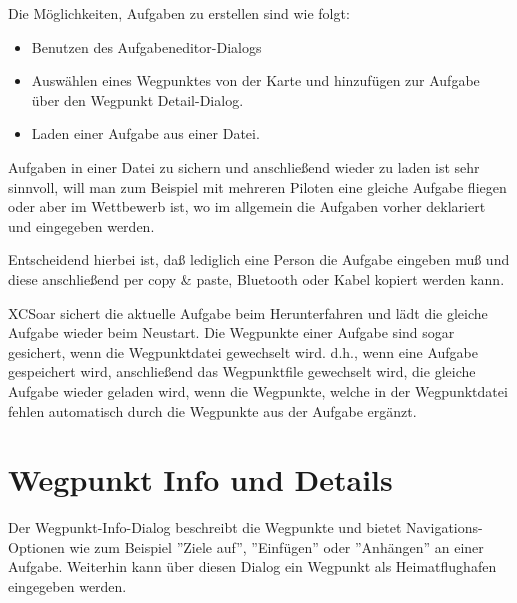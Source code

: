 Die Möglichkeiten, Aufgaben zu erstellen sind wie folgt:
\begin{itemize}
\item Benutzen des Aufgabeneditor-Dialogs
\item Auswählen eines Wegpunktes von der Karte und hinzufügen zur Aufgabe über den Wegpunkt Detail-Dialog.
\item Laden einer Aufgabe aus einer Datei.
\end{itemize}

\tip Aufgaben in einer Datei zu sichern und anschließend wieder zu laden ist sehr sinnvoll,  will man zum Beispiel mit mehreren Piloten eine gleiche Aufgabe fliegen oder aber im Wettbewerb ist, wo im  allgemein die Aufgaben vorher deklariert und eingegeben werden.

Entscheidend hierbei ist, daß lediglich eine Person die Aufgabe eingeben muß und diese anschließend  per copy \& paste,  Bluetooth oder Kabel kopiert werden kann.

\textsf{XCSoar} sichert die aktuelle Aufgabe beim Herunterfahren und lädt die gleiche Aufgabe wieder beim Neustart.  Die Wegpunkte einer Aufgabe sind sogar gesichert, wenn die Wegpunktdatei gewechselt wird. d.h., wenn eine Aufgabe gespeichert wird, anschließend das Wegpunktfile gewechselt wird, die gleiche Aufgabe wieder geladen  wird, wenn die Wegpunkte, welche in der Wegpunktdatei  fehlen automatisch durch die Wegpunkte aus der Aufgabe ergänzt.

\section{Wegpunkt Info und Details }

Der Wegpunkt-Info-Dialog beschreibt die Wegpunkte und bietet Navigations-Optionen wie zum Beispiel ''Ziele auf'', ''Einfügen'' oder ''Anhängen'' an einer Aufgabe. Weiterhin kann über diesen Dialog ein Wegpunkt als Heimatflughafen eingegeben werden.

